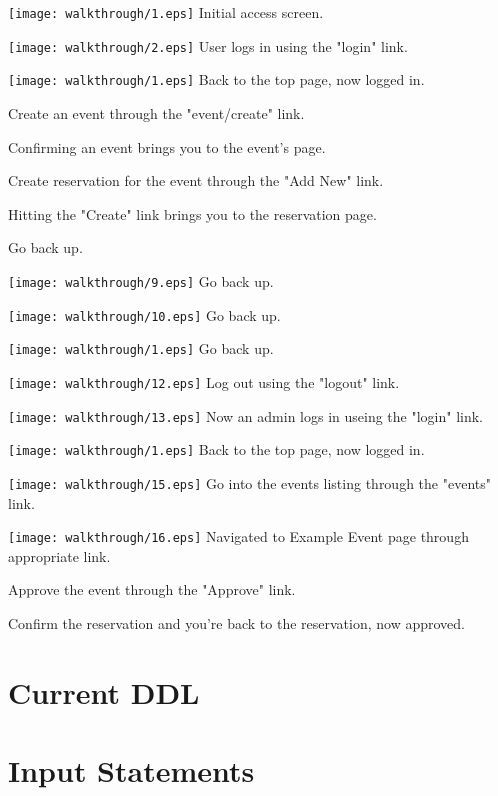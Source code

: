 \documentclass{article}
\begin{document}
\texttt{[image: walkthrough/1.eps]}
{\center Initial access screen.}

\texttt{[image: walkthrough/2.eps]}
{\center User logs in using the "login" link.}

\texttt{[image: walkthrough/1.eps]}
{\center Back to the top page, now logged in.}

{\center Create an event through the "event/create" link.}

{\center Confirming an event brings you to the event's page.}

{\center Create reservation for the event through the "Add New" link.}

{\center Hitting the "Create" link brings you to the reservation page.}

{\center Go back up.}

\texttt{[image: walkthrough/9.eps]}
{\center Go back up.}

\texttt{[image: walkthrough/10.eps]}
{\center Go back up.}

\texttt{[image: walkthrough/1.eps]}
{\center Go back up.}

\texttt{[image: walkthrough/12.eps]}
{\center Log out using the "logout" link.}

\texttt{[image: walkthrough/13.eps]}
{\center Now an admin logs in useing the "login" link.}

\texttt{[image: walkthrough/1.eps]}
{\center Back to the top page, now logged in.}

\texttt{[image: walkthrough/15.eps]}
{\center Go into the events listing through the "events" link.}

\texttt{[image: walkthrough/16.eps]}
{\center Navigated to Example Event page through appropriate link.}

{\center Approve the event through the "Approve" link.}

{\center Confirm the reservation and you're back to the reservation, now approved.}

\section{Current DDL}


\section{Input Statements}

\end{document}
